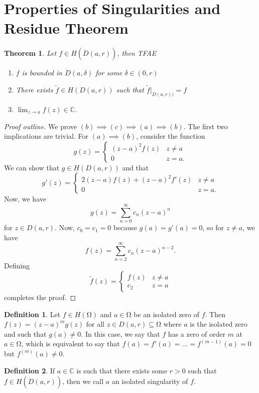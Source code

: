 \documentclass[letterpaper,12pt]{article}
\theoremstyle{definition}
\newtheorem{definition}{Definition}[section]
\theoremstyle{plain}
\newtheorem{thm}{Theorem}[section]
\theoremstyle{remark}
\newcommand{\C}{\mathbb{C}}
\newcommand{\wt}{\widetilde}
\let\oldOmega\Omega
\renewcommand{\Omega}{\mathrm{\oldOmega}}
\begin{document}
\section{Properties of Singularities and Residue Theorem}
\begin{thm}\label{thm:RemovableTFAE}
Let $f\in H(\dot{D}(a,r))$, then TFAE
\begin{enumerate}
	\item $f$ is bounded in $\dot{D}(a,\delta)$ for some $\delta\in(0,r)$
	\item There exists $\wt{f}\in H(D(a,r))$ such that $\wt{f}\vert_{\dot{D}(a,r))}=f$
	\item $\lim_{z\to a}f(z)\in\C$.
\end{enumerate}
\end{thm}

\begin{proof}[Proof outline]
We prove $(b)\implies(c)\implies(a)\implies(b)$. The first two implications are trivial. For $(a)\implies (b)$, consider the function
\[g(z) = \begin{cases}
(z-a)^2f(z) & z\ne a \\
0 & z=a.
\end{cases}\]
We can show that $g\in H(D(a,r))$ and that
\[g'(z) = \begin{cases}
2(z-a)f(z)+(z-a)^2f'(z)& z\ne a \\
0 & z=a.
\end{cases}\]
Now, we have
\[g(z) = \sum_{n=0}^\infty c_n(z-a)^n\]
for $z\in D(a,r)$. Now, $c_0=c_1=0$ because $g(a)=g'(a)=0$, so for $z\ne a$, we have
\[f(z) = \sum_{n=2}^\infty c_n(z-a)^{n-2}.\]
Defining
\[\wt{f}(z) = \begin{cases}
f(z) & z\ne a\\
c_2 & z=a
\end{cases}\]
completes the proof.
\end{proof}

\begin{definition}
Let $f\in H(\Omega)$ and $a\in\Omega$ be an isolated zero of $f$. Then $f(z) = (z-a)^mg(z)$ for all $z\in D(a,r)\subseteq\Omega$ where $a$ is the isolated zero and such that $g(a)\ne 0$. In this case, we say that $f$ has a zero of order $m$ at $a\in \Omega$, which is equivalent to say that $f(a)=f'(a) = \ldots = f^{(m-1)}(a)=0$ but $f^{(m)}(a)\ne 0$.
\end{definition}

\begin{definition}
If $a\in\C$ is such that there exists some $r>0$ such that $f\in H(\dot{D}(a,r))$, then we call $a$ an isolated singularity of $f$.
\end{definition}
\end{document}
